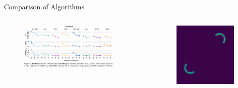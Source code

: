 \documentclass[12pt, aspectratio=169]{beamer}
\begin{document}
\begin{frame}{Comparison of Algorithms}
    \begin{columns}
        \begin{column}{0.9\textwidth}
            \begin{figure}
                \centering
                \includegraphics[width=0.87\textwidth]{"images/benchmarking_results_2moons2.png"}
                \caption{\cite{lueckmann_benchmarking_2021}}
            \end{figure}
        \end{column}

        \begin{column}{0.1\textwidth}
            \begin{figure}
                \centering
                \includegraphics[width=\textwidth]{"images/2moons.png"}
                \caption{\cite{sharrock_sequential_2022}}
            \end{figure}
        \end{column}
    \end{columns}
   
\end{frame}
\end{document}
